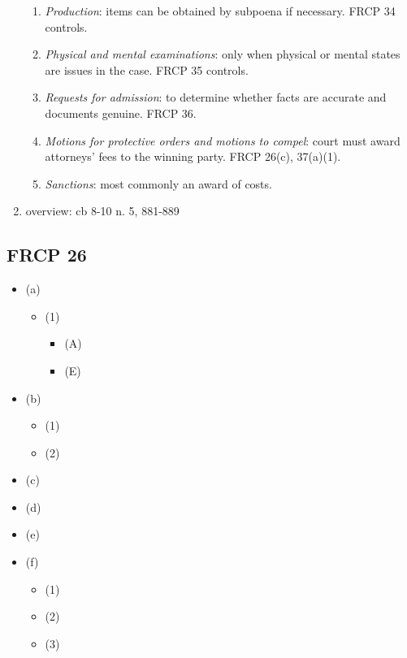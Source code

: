 \begin{enumerate}
\begin{enumerate}
        \item \emph{Production}: items can be obtained by subpoena if necessary. FRCP 34 controls.
        \item \emph{Physical and mental examinations}: only when physical or mental states are issues in the case. FRCP 35 controls.
        \item \emph{Requests for admission}: to determine whether facts are accurate and documents genuine. FRCP 36.
        \item \emph{Motions for protective orders and motions to compel}: court must award attorneys' fees to the winning party. FRCP 26(c), 37(a)(1).
        \item \emph{Sanctions}: most commonly an award of costs.
    \end{enumerate}
    \item overview: cb 8-10 n. 5, 881-889 %
\end{enumerate}

\subsection{FRCP 26}

\begin{itemize}
    \item (a) %
    \begin{itemize}
        \item (1) %
        \begin{itemize}
            \item (A) %
            \item (E) %
        \end{itemize}
    \end{itemize}
    \item (b) %
    \begin{itemize}
        \item (1) %
        \item (2) %
    \end{itemize}
    \item (c) %
    \item (d) %
    \item (e) %
    \item (f) %
    \begin{itemize}
        \item (1) %
        \item (2) %
        \item (3) %
    \end{itemize}
\end{itemize}

